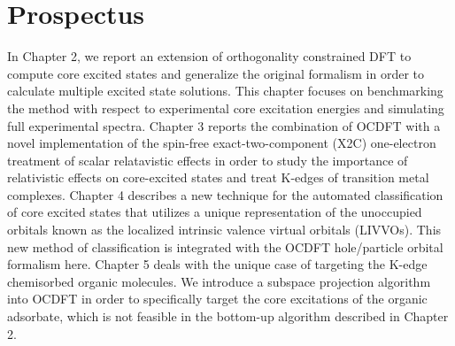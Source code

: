 \documentclass{article}
\begin{document}
\section{Prospectus}
In Chapter 2, we report an extension of orthogonality constrained DFT to compute core excited states and generalize the original formalism in order to calculate multiple excited state solutions. This chapter focuses on benchmarking the method with respect to experimental core excitation energies and simulating full experimental spectra. Chapter 3 reports the combination of OCDFT with a novel implementation of the spin-free exact-two-component (X2C) one-electron treatment of scalar relatavistic effects in order to study the importance of relativistic effects on core-excited states and treat K-edges of transition metal complexes. Chapter 4 describes a new technique for the automated classification of core excited states that utilizes a unique representation of the unoccupied orbitals known as the localized intrinsic valence virtual orbitals (LIVVOs). This new method of classification is integrated with the OCDFT hole/particle orbital formalism here. Chapter 5 deals with the unique case of targeting the K-edge chemisorbed organic molecules. We introduce a subspace projection algorithm into OCDFT in order to specifically target the core excitations of the organic adsorbate, which is not feasible in the bottom-up algorithm described in Chapter 2.

{\footnotesize 


}
\end{document}
